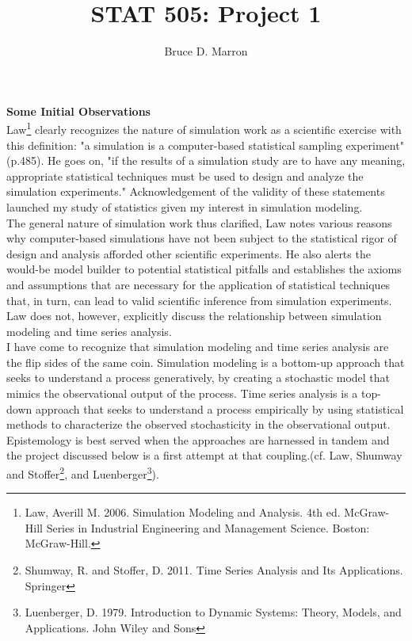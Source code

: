 \documentclass[a4paper,11pt]{article}
\title{STAT 505: Project 1}
\author{Bruce D. Marron}
\begin{document}
\maketitle

\textbf{Some Initial Observations}\\

Law\footnote{Law, Averill M. 2006. Simulation Modeling and Analysis. 4th ed. McGraw-Hill Series in Industrial Engineering and Management Science. Boston: McGraw-Hill.} clearly recognizes the nature of simulation work as a scientific exercise with this definition: "a simulation is a computer-based statistical sampling experiment" (p.485). He goes on, "if the results of a simulation study are to have any meaning, appropriate statistical techniques must be used to design and analyze the simulation experiments." Acknowledgement of the validity of these statements launched my study of statistics given my interest in simulation modeling. \\

The general nature of simulation work thus clarified, Law notes various reasons why computer-based simulations have not been subject to the statistical rigor of design and analysis afforded other scientific experiments.  He also alerts the would-be model builder to potential statistical pitfalls and establishes the axioms and assumptions that are necessary for the application of statistical techniques that, in turn, can lead to valid scientific inference from simulation experiments. Law does not, however, explicitly discuss the relationship between simulation modeling and time series analysis. \\

I have come to recognize that simulation modeling and time series analysis are the flip sides of the same coin.  Simulation modeling is a bottom-up approach that seeks to understand a process generatively, by creating a stochastic model that mimics the observational output of the process. Time series analysis is a top-down approach that seeks to understand a process empirically by using statistical methods to characterize the observed stochasticity in the observational output. Epistemology is best served when the approaches are harnessed in tandem and the project discussed below is a first attempt at that coupling.(cf. Law, Shumway and Stoffer\footnote{Shumway, R. and Stoffer, D. 2011.  Time Series Analysis and Its Applications. Springer}, and Luenberger\footnote{Luenberger, D. 1979.  Introduction to Dynamic Systems: Theory, Models, and Applications.  John Wiley and Sons}). \\  
\end{document}
